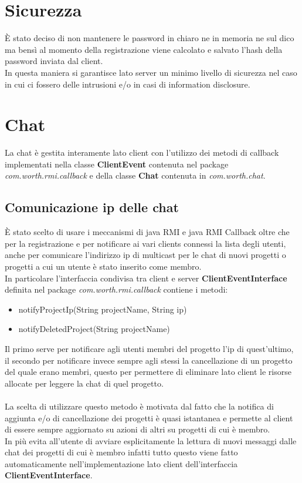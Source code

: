 \documentclass[11pt]{report}
\begin{document}
	\section{Sicurezza}
	È stato deciso di non mantenere le password in chiaro ne in memoria ne sul dico ma bensì al momento della registrazione viene calcolato e salvato l'hash della password inviata dal client.\\
	In questa maniera si garantisce lato server un minimo livello di sicurezza nel caso in cui ci fossero delle intrusioni e/o in casi di information disclosure. 
	
	\section{Chat}
	La chat è gestita interamente lato client con l'utilizzo dei metodi di callback implementati nella classe \textbf{ClientEvent} contenuta nel package \textit{com.worth.rmi.callback} e della classe \textbf{Chat} contenuta in \textit{com.worth.chat}. \\
	
	\subsection{Comunicazione ip delle chat}
	È stato scelto di usare i meccanismi di java RMI e java RMI Callback oltre che per la registrazione e per notificare ai vari clients connessi la lista degli utenti, anche per comunicare l'indirizzo ip di multicast per le chat di nuovi progetti o progetti a cui un utente è stato inserito come membro.\\
	In particolare l'interfaccia condivisa tra client e server \textbf{ClientEventInterface} definita nel package \textit{com.worth.rmi.callback} contiene i metodi:
	
		\begin{itemize}
			\item notifyProjectIp(String projectName, String ip) 
			\item notifyDeletedProject(String projectName)
		\end{itemize}

	Il primo serve per notificare agli utenti membri del progetto l'ip di quest'ultimo, il secondo per notificare invece sempre agli stessi la cancellazione di un progetto del quale erano membri, questo per permettere di eliminare lato client le risorse allocate per leggere la chat di quel progetto.\\
	  \\
	La scelta di utilizzare questo metodo è motivata dal fatto che la notifica di aggiunta e/o di cancellazione dei progetti è quasi istantanea e permette al client di essere sempre aggiornato su azioni di altri su progetti di cui è membro. \\
	In più evita all'utente di avviare esplicitamente la lettura di nuovi messaggi dalle chat dei progetti di cui è membro infatti tutto questo viene fatto automaticamente nell'implementazione lato client dell'interfaccia \textbf{ClientEventInterface}.
	
\end{document}
